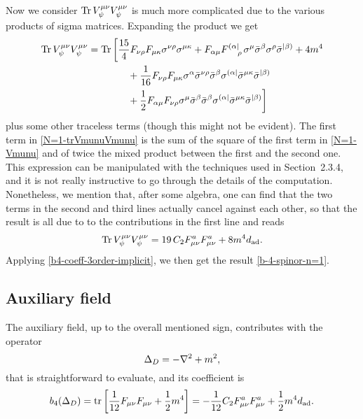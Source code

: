 Now we consider  \( \operatorname{Tr} V_\psi^{\mu\nu} V_\psi^{\mu\nu} \) is much more complicated due to the various products of sigma matrices. Expanding the product we get
\begin{equation}\label{N=1-trVmunuVmunu}
\begin{split}
\Tr V_\psi^{\mu\nu} V_\psi^{\mu\nu} 
	= 
		\Tr
		\bigg[
		&	\frac{15}{4}
				F_{\nu\rho} F_{\mu\kappa} 
				\sigma^{\nu \rho} \sigma^{\mu \kappa}
			+ F_{\alpha\mu} F\indices{^{(\alpha|}_\rho}
				\sigma^\mu \bar \sigma^\beta  \sigma^\rho \bar \sigma^{|\beta)}
				+ 4 m^4
		\\
		&	\quad	
			+ \frac{1}{16} 
				F_{\nu\rho} F_{\mu\kappa} 
				\sigma^\alpha \bar \sigma^{\nu\rho}  \bar \sigma^\beta
				\sigma^{(\alpha|} \bar \sigma^{\mu\kappa} \bar \sigma^{|\beta)}
		\\
		&	\quad
			+ \frac{1}{2} 
				F_{\alpha\mu} F_{\nu\rho} 
				\sigma^\mu  \bar \sigma^{\beta}  \bar \sigma^\beta
				\sigma^{(\alpha|} \bar \sigma^{\mu\kappa} \bar \sigma^{|\beta)}
		\bigg]
\end{split}
\end{equation}
plus some other traceless terms (though this might not be evident). The first term in \eqref{N=1-trVmunuVmunu} is the sum of the square of the first term in \eqref{N=1-Vmunu} and of twice the mixed product between the first and the second one.
This expression can be manipulated with the techniques used in Section~2.3.4, and it is not really instructive to go through the details of the computation.  
Nonetheless, we mention that, after some algebra, one can find that the two terms in the second and third lines actually cancel against each other, so that the result is all due to to the contributions in the first line and reads
\begin{equation}
\begin{split}
\operatorname{Tr} V_\psi^{\mu\nu} V_\psi^{\mu\nu} 
	= 
		19\, C_2 F_{\mu\nu}^a F_{\mu\nu}^a
		+ 8 m^4 d_{ \text{ad} }.
\end{split}
\end{equation}
Applying \eqref{b4-coeff-3order-implicit}, we then get the result \eqref{b-4-spinor-n=1}.




\subsection{Auxiliary field}

The auxiliary field, up to the overall mentioned sign, contributes with the operator
\begin{equation}
\Delta_D = - { \mathcal{\nabla} }^2 + m^2,
\end{equation}
that is straightforward to evaluate, and its coefficient is
\begin{equation}
b_4(\Delta_D)
	= 
		\operatorname{tr} \left[
			\frac{1}{12}  F_{\mu\nu} F_{\mu\nu}
			+ \frac{1}{2} m^4
		\right]
	= 
		- \frac{1}{12} C_2 F^a_{\mu\nu} F^a_{\mu\nu}
		+ \frac{1}{2} m^4 d_{ \text{ad} }.
\end{equation}














